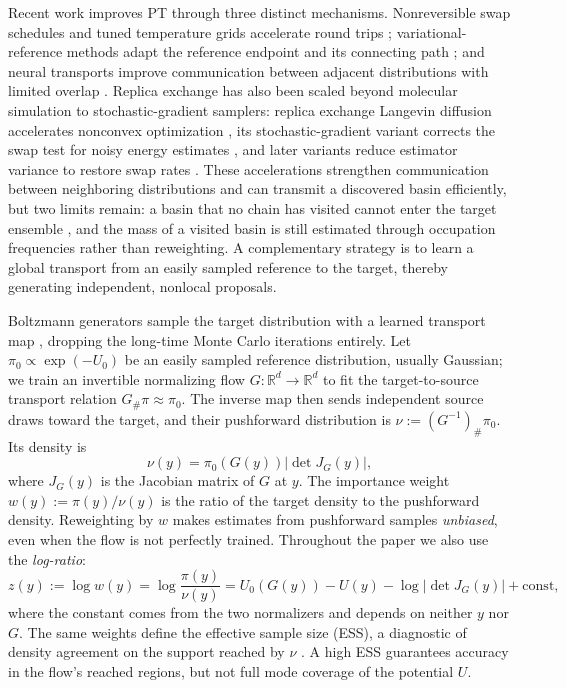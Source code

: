 \documentclass{article}
\begin{document}
Recent work improves PT through three distinct mechanisms. Nonreversible swap schedules and tuned temperature grids accelerate round trips \citep{syed2022nonreversible}; variational-reference methods adapt the reference endpoint and its connecting path \citep{surjanovic2022variational}; and neural transports improve communication between adjacent distributions with limited overlap \citep{zhang2025accelerated}. Replica exchange has also been scaled beyond molecular simulation to stochastic-gradient samplers: replica exchange Langevin diffusion accelerates nonconvex optimization \citep{chen2019accelerating,dong2021replica}, its stochastic-gradient variant corrects the swap test for noisy energy estimates \citep{deng2020nonconvex}, and later variants reduce estimator variance to restore swap rates \citep{deng2021variance}. These accelerations strengthen communication between neighboring distributions and can transmit a discovered basin efficiently, but two limits remain: a basin that no chain has visited cannot enter the target ensemble \citep{woodard2009conditions,chehab2024provable}, and the mass of a visited basin is still estimated through occupation frequencies rather than reweighting.
A complementary strategy is to learn a global transport from an easily sampled reference to the target, thereby generating independent, nonlocal proposals.

Boltzmann generators sample the target distribution with a learned transport map \citep{noe2019boltzmann}, dropping the long-time Monte Carlo iterations entirely. Let $\pi_0\propto\exp(-U_0)$ be an easily sampled reference distribution, usually Gaussian; we train an invertible normalizing flow $G:\mathbb R^d\to\mathbb R^d$ \citep{rezende2015variational,papamakarios2017masked,kingma2018glow} to fit the target-to-source transport relation $G_{\#}\pi\approx\pi_0$. The inverse map then sends independent source draws toward the target, and their pushforward distribution is $\nu:=(G^{-1})_{\#}\pi_0$. Its density is
\begin{equation}
    \nu(y)=\pi_0(G(y))\left|\det J_G(y)\right|,
    \label{eq: pushforward-density}
\end{equation}
where $J_G(y)$ is the Jacobian matrix of $G$ at $y$. The importance weight $w(y):=\pi(y)/\nu(y)$ is the ratio of the target density to the pushforward density. Reweighting by $w$ makes estimates from pushforward samples \emph{unbiased}, even when the flow is not perfectly trained. Throughout the paper we also use the \emph{log-ratio}:
\begin{equation}
	z(y) := \log w(y) = \log \frac{\pi(y)}{\nu(y)} =  U_0(G(y)) - U(y) - \log|\det J_G(y)| + \mathrm{const},
	\label{eq: log-ratio}
\end{equation}
where the constant comes from the two normalizers and depends on neither $y$ nor $G$. The same weights define the effective sample size (ESS), a diagnostic of density agreement on the support reached by $\nu$ \citep{liu2001monte,doucet2001introduction,martino2017rethinking}. A high ESS guarantees accuracy in the flow's reached regions, but not full mode coverage of the potential $U$.
\end{document}
